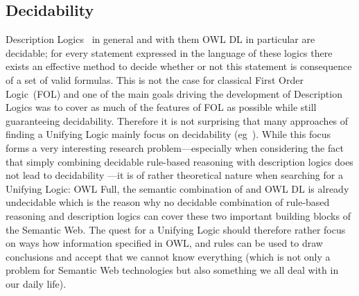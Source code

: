 \subsection{Decidability}
 Description Logics~\cite{dl} in general and with them OWL DL \cite{owldsem} in particular are decidable; for every statement expressed in the language of these logics there
exists an effective method to decide whether or not this statement is consequence of a set of valid formulas. This is not the case for classical 
First Order Logic~(FOL) and one of the main goals driving the development of Description Logics was to cover as much of the features of FOL as possible while still guaranteeing 
decidability. Therefore it is not surprising that many approaches of finding a Unifying Logic mainly focus on decidability (eg~\cite{unilogic,dllog}). 
While this focus forms a very interesting research problem---especially when considering the fact that simply combining decidable rule-based reasoning with description logics 
does not lead to decidability \cite{orl}---it is of rather theoretical nature when searching for a Unifying Logic: OWL Full, 
the semantic combination of \rdf and OWL DL is already undecidable which is the reason why no decidable combination of rule-based reasoning and description logics can cover these 
two important building blocks of the Semantic Web.
%
% 
The quest for a Unifying Logic should therefore rather focus on ways how information specified in OWL, \rdf and rules can be used to draw conclusions
and accept that we cannot know everything (which is not only a problem  for Semantic Web technologies but also something we all deal with in our daily life). 







